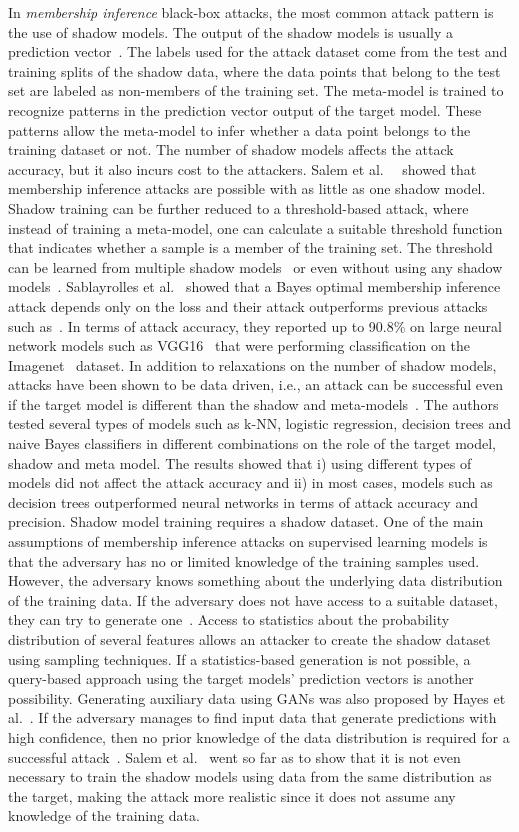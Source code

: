 In \textit{membership inference} black-box attacks, the most common attack pattern is the use of shadow models. The output of the shadow models is usually a prediction vector~.  The labels used for the attack dataset come from the test and training splits of the shadow data, where the data points that belong to the test set are labeled as non-members of the training set. The meta-model is trained to recognize patterns in the prediction vector output of the target model. These patterns allow the meta-model to infer whether a data point belongs to the training dataset or not. The number of shadow models affects the attack accuracy, but it also incurs cost to the attackers. Salem et al.~~ showed that membership inference attacks are possible with as little as one shadow model. 
Shadow training can be further reduced to a threshold-based attack, where instead of training a meta-model, one can calculate a suitable threshold function that indicates whether a sample is a member of the training set. The threshold can be learned from multiple shadow models~ or even without using any shadow models~. Sablayrolles et al.~ showed that a Bayes optimal membership inference attack depends only on the loss and their attack outperforms previous attacks such as~. In terms of attack accuracy, they reported up to 90.8\% on large neural network models such as VGG16~ that were performing classification on the Imagenet~ dataset.
In addition to relaxations on the number of shadow models, attacks have been shown to be data driven, i.e., an attack can be successful even if the target model is different than the shadow and meta-models~. The authors tested several types of models such as k-NN, logistic regression, decision trees and naive Bayes classifiers in different combinations on the role of the target model, shadow and meta model. The results showed that i) using different types of models did not affect the attack accuracy and ii) in most cases, models such as decision trees outperformed neural networks in terms of attack accuracy and precision.
Shadow model training requires a shadow dataset. One of the main assumptions of membership inference attacks on supervised learning models is that the adversary has no or limited knowledge of the training samples used. However, the adversary knows something about the underlying data distribution of the training data. If the adversary does not have access to a suitable dataset, they can try to generate one~. Access to statistics about the probability distribution of several features allows an attacker to create the shadow dataset using sampling techniques. If a statistics-based generation is not possible, a query-based approach using the target models' prediction vectors is another possibility. Generating auxiliary data using GANs was also proposed by Hayes et al.~. If the adversary manages to find input data that generate predictions with high confidence, then no prior knowledge of the data distribution is required for a successful attack~. Salem et al.~ went so far as to show that it is not even necessary to train the shadow models using data from the same distribution as the target, making the attack more realistic since it does not assume any knowledge of the training data.    

